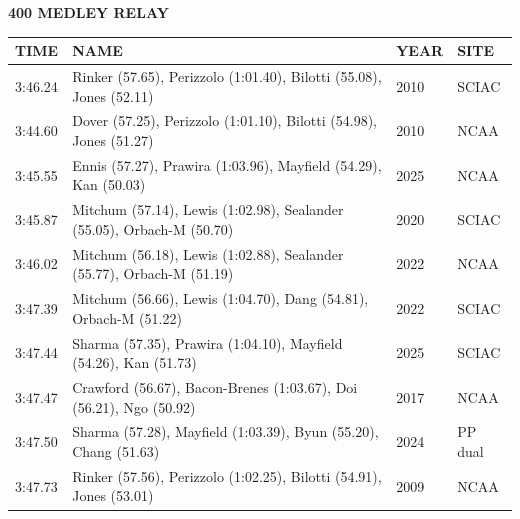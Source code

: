 \begin{table}[H]
\centering
\begin{minipage}[t]{0.6\textwidth}
\centering
\textbf{400 MEDLEY RELAY}\\[0.1cm]
\begin{tabular}{@{}p{1.8cm}p{2.8cm}p{1.2cm}p{1.4cm}@{}}
\hline
    \textbf{TIME} & \textbf{NAME} & \textbf{YEAR} & \textbf{SITE} \\
\hline
    3:46.24 & Rinker (57.65), Perizzolo (1:01.40), Bilotti (55.08), Jones (52.11) & 2010 & SCIAC \\
    3:44.60 & Dover (57.25), Perizzolo (1:01.10), Bilotti (54.98), Jones (51.27) & 2010 & NCAA \\
    3:45.55 & Ennis (57.27), Prawira (1:03.96), Mayfield (54.29), Kan (50.03) & 2025 & NCAA \\
    3:45.87 & Mitchum (57.14), Lewis (1:02.98), Sealander (55.05), Orbach-M (50.70) & 2020 & SCIAC \\
    3:46.02 & Mitchum (56.18), Lewis (1:02.88), Sealander (55.77), Orbach-M (51.19) & 2022 & NCAA \\
    3:47.39 & Mitchum (56.66), Lewis (1:04.70), Dang (54.81), Orbach-M (51.22) & 2022 & SCIAC \\
    3:47.44 & Sharma (57.35), Prawira (1:04.10), Mayfield (54.26), Kan (51.73) & 2025 & SCIAC \\
    3:47.47 & Crawford (56.67), Bacon-Brenes (1:03.67), Doi (56.21), Ngo (50.92) & 2017 & NCAA \\
    3:47.50 & Sharma (57.28), Mayfield (1:03.39), Byun (55.20), Chang (51.63) & 2024 & PP dual \\
    3:47.73 & Rinker (57.56), Perizzolo (1:02.25), Bilotti (54.91), Jones (53.01) & 2009 & NCAA \\
\hline
\end{tabular}
\end{minipage}
\end{table}

